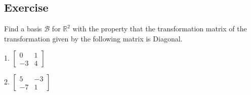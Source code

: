 \documentclass[aima104_lecturenotes_ku.tex]{subfiles}
\begin{document}
\subsection{Exercise}
Find a basis $\mathcal{B}$ for $\mathbb{R}^2$ with the property that the transformation matrix of the transformation given by the following matrix is Diagonal.
\begin{multicols}{2}
  1. $
  \begin{bmatrix}
    0 & 1 \\
    -3 & 4
  \end{bmatrix}
  $
  \columnbreak

  2. $
  \begin{bmatrix}
    5 & -3 \\
    -7 & 1
  \end{bmatrix}
  $

\end{multicols}
\end{document}
